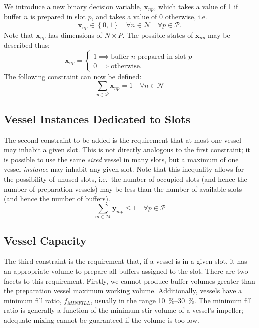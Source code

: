 We introduce a new binary decision variable, $\boldsymbol{x}_{np}$, which takes
a value of 1 if buffer $n$ is prepared in slot $p$, and takes a value of 0
otherwise, i.e.
\begin{equation}
    \boldsymbol{x}_{np} \in \left\{ 0, 1 \right\} \quad \forall n \in 
    \mathcal{N} \quad \forall p \in \mathcal{P}.
    \label{eq.x}
\end{equation}
Note that $\boldsymbol{x}_{np}$ has dimensions of $N \times P$.
The possible states of $\boldsymbol{x}_{np}$ may be described thus:
\begin{equation}
    \boldsymbol{x}_{np} =
    \begin{cases}
        1 \implies \text{buffer $n$ prepared in slot $p$}\\
        0 \implies \text{otherwise.}
    \end{cases}
\end{equation}
The following constraint can now be defined:
\begin{equation}
    \sum_{p \in \mathcal{P}} \boldsymbol{x}_{np} = 1 \quad \forall n \in
    \mathcal{N}
    \label{eq.constr1}
\end{equation}

\subsection{Vessel Instances Dedicated to Slots}\label{SS.constr2}

The second constraint to be added is the requirement that at most one vessel
may inhabit a given slot.
This is not directly analogous to the first constraint; it is possible to
use the same \emph{sized} vessel in many slots, but a maximum of one vessel
\emph{instance} may inhabit any given slot.
Note that this inequality allows for the possibility of unused slots, i.e.\ the
number of occupied slots (and hence the number of preparation vessels) may be
less than the number of available slots (and hence the number of buffers).
\begin{equation}
    \sum_{m \in \mathcal{M}} \boldsymbol{y}_{mp} \le 1 \quad \forall p \in 
    \mathcal{P}
    \label{eq.constr2}
\end{equation}

\subsection{Vessel Capacity}\label{SS.constr3}

The third constraint is the requirement that, if a vessel is in a given slot,
it has an appropriate volume to prepare all buffers assigned to the slot.
There are two facets to this requirement.
Firstly, we cannot produce buffer volumes greater than the preparation vessel
maximum working volume.
Additionally, vessels have a minimum fill ratio, $f_{\mathit{MINFILL}}$,
usually in the range \SIrange{10}{30}{\percent}.
The minimum fill ratio is generally a function of the minimum stir volume of a
vessel's impeller; adequate mixing cannot be guaranteed if the volume is too
low.

